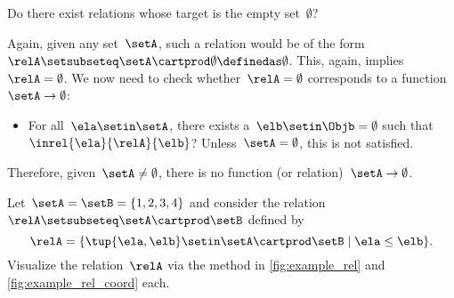 \begin{exercise}
    Do there exist relations whose target is the empty set~$\emptyset$?
\end{exercise}
\begin{solution}
    Again, given any set~$\setA$, such a relation would be of the form~$\relA \setsubseteq \setA \cartprod \emptyset\definedas \emptyset$.
    This, again, implies~$\relA=\emptyset$.
    We now need to check whether~$\relA=\emptyset$ corresponds to a function~$\setA \to \emptyset$:
    \begin{itemize}
        \item For all~$\ela\setin \setA$, there exists a~$\elb\setin \Objb=\emptyset$ such that~$\inrel{\ela}{\relA}{\elb}$?
              Unless~$\setA=\emptyset$, this is not satisfied.
    \end{itemize}
    Therefore, given~$\setA \neq \emptyset$, there is no function (or relation)~$\setA \to \emptyset$.
\end{solution}

\vfill
\begin{gradedexercise}
    \label{ex:visualize-leq-relation}
    Let~$\setA = \setB = \{1, 2, 3, 4 \}$ and consider the relation~$\relA \setsubseteq \setA \cartprod \setB$ defined by
    \begin{equation*}
        \relA = \{ \tup{\ela,\elb} \setin \setA \cartprod \setB \mid \ela \leq \elb \}.
    \end{equation*}
    Visualize the relation~$\relA$ via the method in \cref{fig:example_rel} and \cref{fig:example_rel_coord} each.
\end{gradedexercise}

